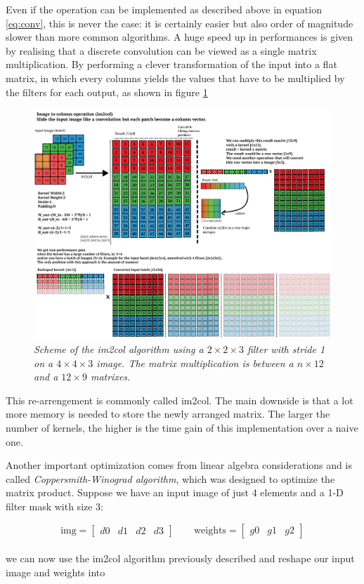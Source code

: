 \documentclass[12pt,a4paper]{report}
\begin{document}
Even if the operation can be implemented as described above in equation \ref{eq:conv}, this is never the case: it is certainly easier but also order of magnitude slower than more common algorithms.
A huge speed up in performances is given by realising that a discrete convolution can be viewed as a single matrix multiplication. By performing a clever transformation of the input into a flat matrix, in which every columns yields the values that have to be multiplied by the filters for each output, as shown in figure \ref{fig:im2col}

\begin{figure}[h]
 \centering
 \includegraphics[scale=0.35]{./images/im2col.png}
 \caption{\it Scheme of the im2col algorithm using a $2 \times 2 \times 3$ filter with stride 1 on a $4 \times 4 \times 3$ image. The matrix multiplication is between a $n \times 12$ and a $12 \times 9$ matrixes.}
 \label{fig:im2col}
\end{figure}

This re-arrengement is commonly called im2col. The main downside is that a lot more memory is needed to store the newly arranged matrix.
The larger the number of kernels, the higher is the time gain of this implementation over a naive one.  

Another important optimization comes from linear algebra considerations and is called {\it Coppersmith-Winograd algorithm}, which was designed to optimize the matrix product.
Suppose we have an input image of just 4 elements and a 1-D filter mask with size 3:

\begin{equation}
\mbox{img} = \left[\begin{array}{cccc} d0 & d1 & d2 & d3 \end{array}\right] \quad\quad \mbox{weights} = \left[\begin{array}{ccc} g0 & g1 & g2 \end{array}\right]
\end{equation}
\\
we can now use the \textsf{im2col} algorithm previously described and reshape our input image and weights into
\end{document}
